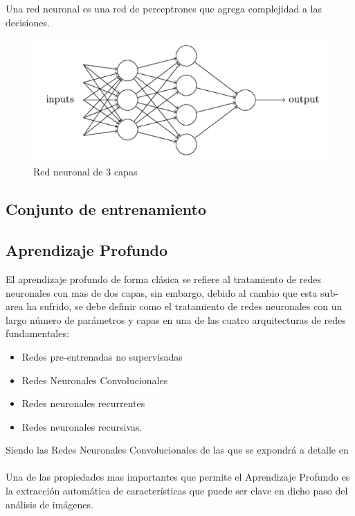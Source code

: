     \newpage
    Una red neuronal es una red de perceptrones que agrega complejidad a las decisiones.
    \begin{figure}[H]
        \centering
        \includegraphics[width=1\textwidth]{capitulo2/images/NNmodel.PNG}
        \caption{Red neuronal de 3 capas}
        \label{fig:NNmodel}
    \end{figure}
    \subsection{Conjunto de entrenamiento}
    
    
    \subsection{Aprendizaje Profundo}
        El aprendizaje profundo de forma clásica se refiere al tratamiento de redes neuronales con mas de dos capas, sin embargo, debido al cambio que esta sub-area ha sufrido, se debe definir como el tratamiento de redes neuronales con un largo número de parámetros y capas en una de las cuatro arquitecturas de redes fundamentales:
        \begin{itemize}
            \item Redes pre-entrenadas no supervisadas
            \item Redes Neuronales Convolucionales
            \item Redes neuronales recurrentes
            \item Redes neuronales recursivas.
        \end{itemize}
    
    Siendo las Redes Neuronales Convolucionales de las que se expondrá a detalle en  \\%
    \\Una de las propiedades mas importantes que permite el Aprendizaje Profundo es la extracción automática de características que puede ser clave en dicho paso del análisis de imágenes.
    
